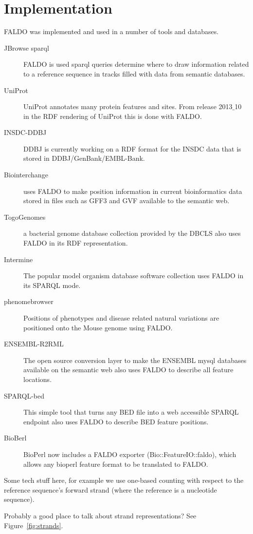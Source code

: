 \section*{Implementation}
FALDO was implemented and used in a number of tools and databases.

\begin{description}
\item[JBrowse sparql] FALDO is used sparql queries determine where to draw information related to a reference sequence in tracks filled with data from semantic databases. 
\item[UniProt] UniProt annotates many protein features and sites. From release 2013$\_$10 in the RDF rendering of UniProt this is done with FALDO.
\item[INSDC-DDBJ] DDBJ is currently working on a RDF format for the INSDC data that is stored in DDBJ/GenBank/EMBL-Bank.
\item[Biointerchange] uses FALDO to make position information in current bioinformatics data stored in files such as GFF3 and GVF available to the semantic web.
\item[TogoGenomes] a bacterial genome database collection provided by the DBCLS also uses FALDO in its RDF representation.
\item[Intermine] The popular model organism database software collection uses FALDO in its SPARQL mode.
\item[phenomebrowser] Positions of phenotypes and disease related natural variations are positioned onto the Mouse genome using FALDO.
\item[ENSEMBL-R2RML] The open source conversion layer to make the ENSEMBL mysql databases available on the semantic web also uses FALDO to describe all feature locations.
\item[SPARQL-bed] This simple tool that turns any BED file into a web accessible SPARQL endpoint also uses FALDO to describe BED feature positions.
\item[BioBerl] BioPerl\cite{BioPerl2002} now includes a FALDO exporter (Bio::FeatureIO::faldo), which allows any bioperl feature format to be translated to FALDO.
\end{description}




Some tech stuff here, for example we use one-based counting
with respect to the reference sequence's forward strand
(where the reference is a nucleotide sequence).

Probably a good place to talk about strand representations?
See Figure~\ref{fig:strands}.

